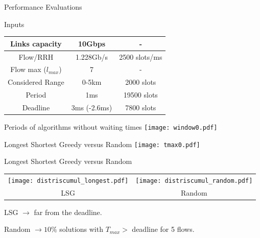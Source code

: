 \documentclass[10 pt]{beamer}
\begin{document}
\begin{section}{Performance Evaluations}
  
 \begin{frame}{Inputs}
 
 \centering
   \begin{tabular}{|c|c|c|}
   \hline
    Links capacity & 10Gbps & -\\
    \hline
    Flow/RRH & 1.228Gb/s & 2500 slots/ms\\
    \hline
    Flow max ($l_{max}$) & 7 & - \\
    \hline
    Considered Range & 0-5km & 2000 slots\\
    \hline
    Period & 1ms & 19500 slots\\
    \hline
    Deadline & 3ms (-2.6ms) & 7800 slots\\
    \hline
    \end{tabular}

 \end{frame}

\begin{frame}{Periods of algorithms without waiting times}
   \centering
  \texttt{[image: window0.pdf]}\\
\end{frame}

\begin{frame}{Longest Shortest Greedy versus Random}
   \centering
  \texttt{[image: tmax0.pdf]}\\
\end{frame}

\begin{frame}{Longest Shortest Greedy versus Random}
   \centering
    \begin{tabular}{c c}
      \texttt{[image: distriscumul\_longest.pdf]} &  \texttt{[image: distriscumul\_random.pdf]}\\
      LSG & Random \\
    \end{tabular}
     LSG $\rightarrow$ far from the deadline.
     
    Random $\rightarrow 10\%$ solutions with $T_{max} >$ deadline for 5 flows.

\end{frame}

\end{section}
\end{document}
